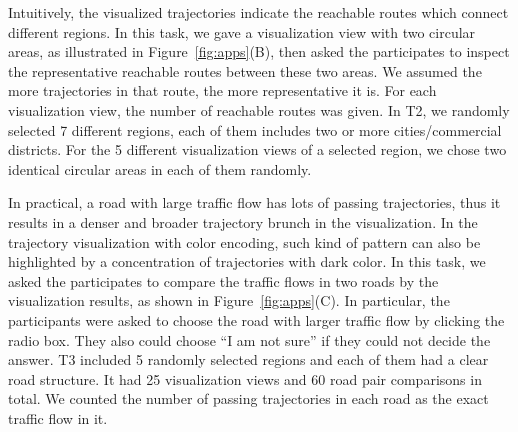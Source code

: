Intuitively, the visualized trajectories indicate the reachable routes which connect different regions.
In this task, we gave a visualization view with two circular areas, as illustrated in Figure~\ref{fig:apps}(B),
then asked the participates to inspect the representative reachable routes between these two areas.
We assumed the more trajectories in that route, the more representative it is.
For each visualization view, the number of reachable routes was given.
In T2, we randomly selected 7 different regions, each of them includes two or more cities/commercial districts.
For the 5 different visualization views of a selected region, we chose two identical circular areas in each of them randomly.


In practical, a road with large traffic flow has lots of passing trajectories, thus it results in a denser and broader trajectory brunch in the visualization.
In the trajectory visualization with color encoding, such kind of pattern can also be highlighted by a concentration of trajectories with {dark} color.
In this task, we asked the participates to compare the traffic flows in two roads by the visualization results, as shown in Figure~\ref{fig:apps}(C).
In particular, the participants were asked to choose the road with larger traffic flow by clicking the radio box.
They also could choose ``I am not sure'' if they could not decide the answer.
T3 included 5 randomly selected regions and each of them had a clear road structure.
It had 25 visualization views and 60 road pair comparisons in total.
We counted the number of passing trajectories in each road as the exact traffic flow in it.




